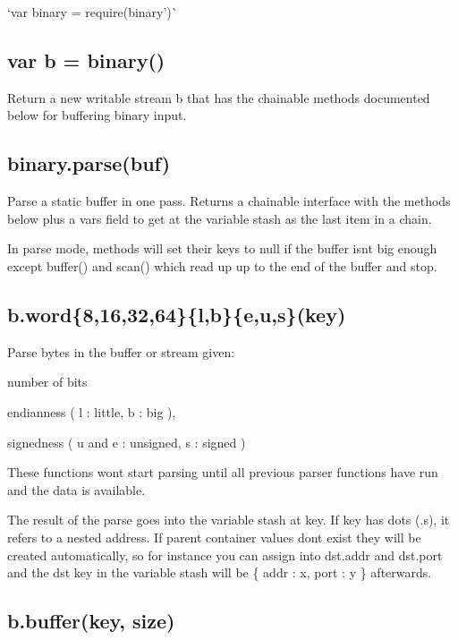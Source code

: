 `var binary = require(\textquotesingle{}binary')\`{}

\subsection*{var b = binary() }

Return a new writable stream {\ttfamily b} that has the chainable methods documented below for buffering binary input.

\subsection*{binary.\+parse(buf) }

Parse a static buffer in one pass. Returns a chainable interface with the methods below plus a {\ttfamily vars} field to get at the variable stash as the last item in a chain.

In parse mode, methods will set their keys to {\ttfamily null} if the buffer isn\textquotesingle{}t big enough except {\ttfamily buffer()} and {\ttfamily scan()} which read up up to the end of the buffer and stop.

\subsection*{b.\+word\{8,16,32,64\}\{l,b\}\{e,u,s\}(key) }

Parse bytes in the buffer or stream given\+:


\begin{DoxyItemize}
\item number of bits
\item endianness ( l \+: little, b \+: big ),
\item signedness ( u and e \+: unsigned, s \+: signed )
\end{DoxyItemize}

These functions won\textquotesingle{}t start parsing until all previous parser functions have run and the data is available.

The result of the parse goes into the variable stash at {\ttfamily key}. If {\ttfamily key} has dots ({\ttfamily .}s), it refers to a nested address. If parent container values don\textquotesingle{}t exist they will be created automatically, so for instance you can assign into {\ttfamily dst.\+addr} and {\ttfamily dst.\+port} and the {\ttfamily dst} key in the variable stash will be {\ttfamily \{ addr \+: x, port \+: y \}} afterwards.

\subsection*{b.\+buffer(key, size) }

